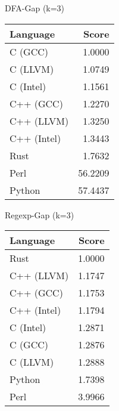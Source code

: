 \begin{subtable}{0.33\textwidth}
    \centering
    \caption{DFA-Gap (k=3)}
    \label{table:runtime:dfa_gap}
    \begin{tabular}{|l|r|}
        \hline
        Language & Score \\
        \hline
        C (GCC) & 1.0000 \\
        C (LLVM) & 1.0749 \\
        C (Intel) & 1.1561 \\
        C++ (GCC) & 1.2270 \\
        C++ (LLVM) & 1.3250 \\
        C++ (Intel) & 1.3443 \\
        Rust & 1.7632 \\
        Perl & 56.2209 \\
        Python & 57.4437 \\
        \hline
    \end{tabular}
\end{subtable}%
\begin{subtable}{0.33\textwidth}
    \centering
    \caption{Regexp-Gap (k=3)}
    \label{table:runtime:regexp}
    \begin{tabular}{|l|r|}
        \hline
        Language & Score \\
        \hline
        Rust & 1.0000 \\
        C++ (LLVM) & 1.1747 \\
        C++ (GCC) & 1.1753 \\
        C++ (Intel) & 1.1794 \\
        C (Intel) & 1.2871 \\
        C (GCC) & 1.2876 \\
        C (LLVM) & 1.2888 \\
        Python & 1.7398 \\
        Perl & 3.9966 \\
        \hline
    \end{tabular}
\end{subtable}
